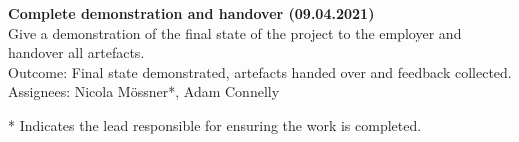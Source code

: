 \documentclass[11pt]{article}
\begin{document}
\textbf{Complete demonstration and handover (09.04.2021)}\\
Give a demonstration of the final state of the project to the employer and handover all artefacts.\\
Outcome: Final state demonstrated, artefacts handed over and feedback collected.\\
Assignees: Nicola M\"{o}ssner*, Adam Connelly

* Indicates the lead responsible for ensuring the work is completed.




\end{document}
